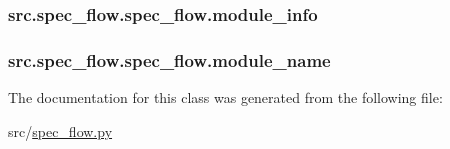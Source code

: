 \hypertarget{classsrc_1_1spec__flow_1_1spec__flow_ac0a0b21b31caeac8ad433e7b83a7a4b6}{
\subsubsection[{module\-\_\-info}]{\setlength{\rightskip}{0pt plus 5cm}src.\-spec\-\_\-flow.\-spec\-\_\-flow.\-module\-\_\-info}}\label{classsrc_1_1spec__flow_1_1spec__flow_ac0a0b21b31caeac8ad433e7b83a7a4b6}
\hypertarget{classsrc_1_1spec__flow_1_1spec__flow_a20bffd81b17afc76d7147c31fb291c17}{
\subsubsection[{module\-\_\-name}]{\setlength{\rightskip}{0pt plus 5cm}src.\-spec\-\_\-flow.\-spec\-\_\-flow.\-module\-\_\-name}}\label{classsrc_1_1spec__flow_1_1spec__flow_a20bffd81b17afc76d7147c31fb291c17}


The documentation for this class was generated from the following file\-:\begin{DoxyCompactItemize}
\item 
src/\hyperlink{spec__flow_8py}{spec\-\_\-flow.\-py}\end{DoxyCompactItemize}

